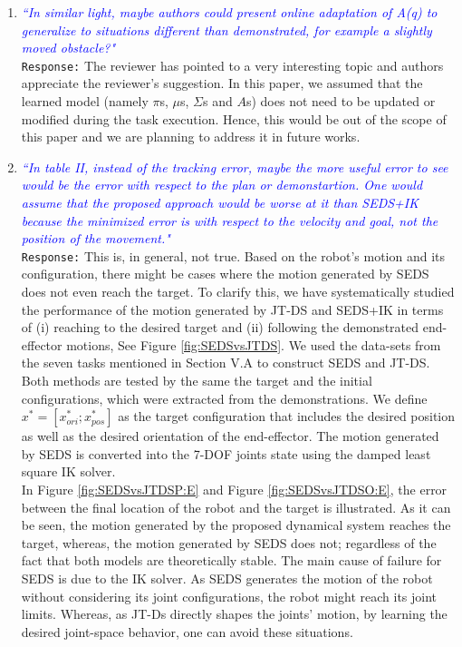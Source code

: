 \documentclass{article}
\begin{document}
\begin{enumerate}
\item \textcolor{blue}{\textit{``In similar light, maybe authors could present online adaptation of
A(q) to generalize to situations different than demonstrated, for
example a slightly moved obstacle?"}}\\
\texttt{Response:} \small The reviewer has pointed to a very interesting topic and authors appreciate the reviewer’s suggestion. In this paper, we assumed that the learned model (namely $ \pi $s, $ \mu $s, $ \Sigma $s and $A$s) does not need to be updated or modified during the task execution. Hence, this would be out of the scope of this paper and we are planning to address it in future works.

\item \textcolor{blue}{\textit{``In table II, instead of the tracking error, maybe the more useful
error to see would be the error with respect to the plan or
demonstartion. One would assume that the proposed approach would be
worse at it than SEDS+IK because the minimized error is with respect to
the velocity and goal, not the position of the movement."}}\\
\texttt{Response:} \small This is, in general, not true. Based on the robot's motion and its configuration, there might be cases where the motion generated by SEDS does not even reach the target. To clarify this, we have systematically studied the performance of the motion generated by JT-DS and SEDS+IK in terms of (i) reaching to the desired target and (ii) following the demonstrated end-effector motions, See Figure \ref{fig:SEDSvsJTDS}. We used the data-sets from the seven tasks mentioned in Section V.A to construct SEDS and JT-DS. Both methods are tested by the same the target and the initial configurations, which were extracted from the demonstrations. We define $ x^*=[x^*_{ori};x^*_{pos}] $ as the target configuration that includes the desired position as well as the desired  orientation of the end-effector. The motion generated by SEDS is converted into the 7-DOF joints state using the damped least square IK solver.\\ 
In Figure \ref{fig:SEDSvsJTDSP:E} and Figure \ref{fig:SEDSvsJTDSO:E}, the error between the final location of the robot and the target is illustrated. As it can be seen, the motion generated by the proposed dynamical system reaches the target, whereas, the motion generated by SEDS does not; regardless of the fact that both models are theoretically stable. The main cause of failure for SEDS is due to the IK solver. As SEDS generates the motion of the robot without considering its joint configurations, the robot might reach its joint limits.  Whereas, as JT-Ds directly shapes the joints' motion, by learning the desired joint-space behavior, one can avoid these situations.  


\end{enumerate}
\end{document}
